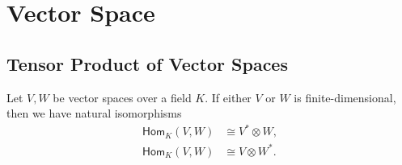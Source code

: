 \chapter{Vector Space}

\section{Tensor Product of Vector Spaces}
\begin{proposition}{}{}
    Let $V, W$ be vector spaces over a field $K$. If either $V$ or $W$ is finite-dimensional, then we have natural isomorphisms
    \[
        \begin{aligned}
            \mathsf{Hom}_K(V, W) & \cong V^*\otimes W, \\
            \mathsf{Hom}_K(V, W) & \cong V\otimes W^*.
        \end{aligned}
    \]
\end{proposition}